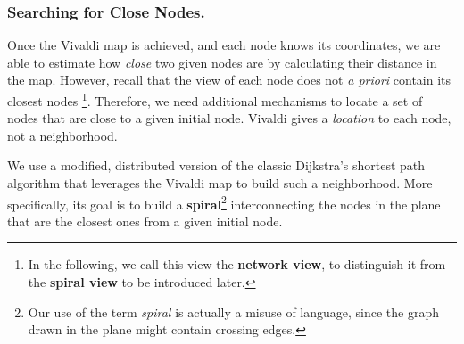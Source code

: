 

\subsubsection*{Searching for Close Nodes.}

Once the Vivaldi map is achieved, and each node knows its coordinates, we are
able to estimate how \emph{close} two given nodes are by calculating their
distance in the map. However, recall that the view of each node does not \emph{a
priori} contain its closest nodes \footnote{In the following, we call this view the {\bf
network view}, to distinguish it from the {\bf spiral view} to be introduced
later.}. Therefore, we need additional mechanisms to locate a set of nodes that
are close to a given initial node. Vivaldi gives a \emph{location} to each node,
not a neighborhood. 

We use a modified, distributed version of the classic Dijkstra's shortest path
algorithm that leverages the Vivaldi map to build such a neighborhood. More
specifically, its goal is to build a {\bf spiral}\footnote{Our use of the term
\emph{spiral} is actually a misuse of language, since the graph drawn in the
plane might contain crossing edges.} interconnecting the nodes in the plane that
are the closest ones from a given initial node.

